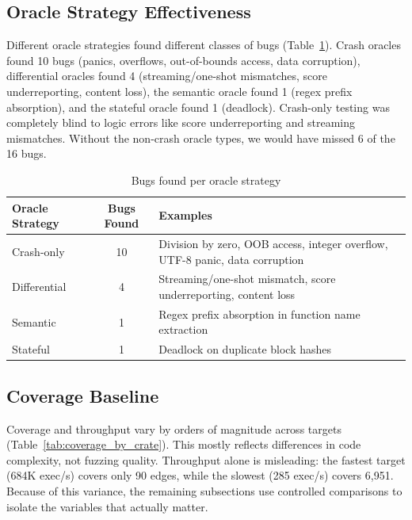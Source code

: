 \documentclass[11pt]{article}
\begin{document}
\subsection{Oracle Strategy Effectiveness}

Different oracle strategies found different classes of bugs (Table~\ref{tab:oracle_effectiveness}). Crash oracles found 10 bugs (panics, overflows, out-of-bounds access, data corruption), differential oracles found 4 (streaming/one-shot mismatches, score underreporting, content loss), the semantic oracle found 1 (regex prefix absorption), and the stateful oracle found 1 (deadlock). Crash-only testing was completely blind to logic errors like score underreporting and streaming mismatches. Without the non-crash oracle types, we would have missed 6 of the 16 bugs.

\begin{table}[H]
\centering
\caption{Bugs found per oracle strategy}
\label{tab:oracle_effectiveness}
\begin{tabular}{@{}lcp{7cm}@{}}
\toprule
Oracle Strategy & Bugs Found & Examples \\
\midrule
Crash-only & 10 & Division by zero, OOB access, integer overflow, UTF-8 panic, data corruption \\
Differential & 4 & Streaming/one-shot mismatch, score underreporting, content loss \\
Semantic & 1 & Regex prefix absorption in function name extraction \\
Stateful & 1 & Deadlock on duplicate block hashes \\
\bottomrule
\end{tabular}
\end{table}

\subsection{Coverage Baseline}

Coverage and throughput vary by orders of magnitude across targets (Table~\ref{tab:coverage_by_crate}). This mostly reflects differences in code complexity, not fuzzing quality. Throughput alone is misleading: the fastest target (684K exec/s) covers only 90 edges, while the slowest (285 exec/s) covers 6,951. Because of this variance, the remaining subsections use controlled comparisons to isolate the variables that actually matter.
\end{document}
